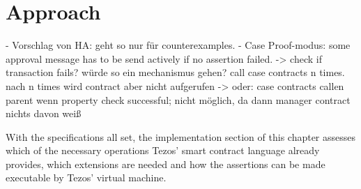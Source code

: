 \chapter{Approach}\label{chap:approach}


- Vorschlag von HA: geht so nur für counterexamples.
- Case Proof-modus: some approval message has to be send actively if no assertion failed.
	-> check if transaction fails? würde so ein mechanismus gehen? call case contracts n times. nach n times wird contract aber nicht aufgerufen
	-> oder: case contracts callen parent wenn property check successful; nicht möglich, da dann manager contract nichts davon weiß

With the specifications all set, the implementation section of this chapter assesses which of the necessary operations Tezos' smart contract language already provides, which extensions are needed and how the assertions can be made executable by Tezos' virtual machine.
 